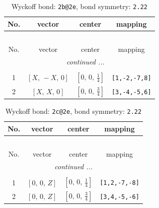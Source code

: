 \documentclass[fleqn,8pt]{jsarticle}
\begin{document}
\renewcommand{\arraystretch}{1.2}
\begin{longtable}{cccc}
\caption{Wyckoff bond: {\tt 2b@2e}, bond symmetry: {\tt 2.22}}
 \\
 \hline \hline
No. & vector & center & mapping \\ \hline \endfirsthead

\multicolumn{3}{l}{\tablename\ \thetable{}} \\
 \hline \hline
No. & vector & center & mapping \\ \hline \endhead

 \hline \hline
\multicolumn{3}{r}{\footnotesize\it continued ...} \\ \endfoot

 \hline \hline
\multicolumn{3}{r}{} \\ \endlastfoot

1 & $\left[ X,\, - X,\, 0 \right]$ & $\left[ 0,\, 0,\, \frac{1}{4} \right]$ & {\tt [1,-2,-7,8]} \\ \hline
2 & $\left[ X,\, X,\, 0 \right]$ & $\left[ 0,\, 0,\, \frac{3}{4} \right]$ & {\tt [3,-4,-5,6]} \\
\end{longtable}
\renewcommand{\arraystretch}{1.2}
\begin{longtable}{cccc}
\caption{Wyckoff bond: {\tt 2c@2e}, bond symmetry: {\tt 2.22}}
 \\
 \hline \hline
No. & vector & center & mapping \\ \hline \endfirsthead

\multicolumn{3}{l}{\tablename\ \thetable{}} \\
 \hline \hline
No. & vector & center & mapping \\ \hline \endhead

 \hline \hline
\multicolumn{3}{r}{\footnotesize\it continued ...} \\ \endfoot

 \hline \hline
\multicolumn{3}{r}{} \\ \endlastfoot

1 & $\left[ 0,\, 0,\, Z \right]$ & $\left[ 0,\, 0,\, \frac{1}{4} \right]$ & {\tt [1,2,-7,-8]} \\ \hline
2 & $\left[ 0,\, 0,\, Z \right]$ & $\left[ 0,\, 0,\, \frac{3}{4} \right]$ & {\tt [3,4,-5,-6]} \\
\end{longtable}
\renewcommand{\arraystretch}{1.2}
\end{document}
